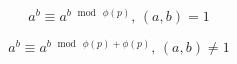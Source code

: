 $$
a^b \equiv a^{b\,\bmod\,{\phi(p)}}, \, (a, b) = 1
$$

$$
a^b \equiv a^{b\,\bmod\,{\phi(p)} + \phi(p)}, \, (a, b) \neq 1
$$